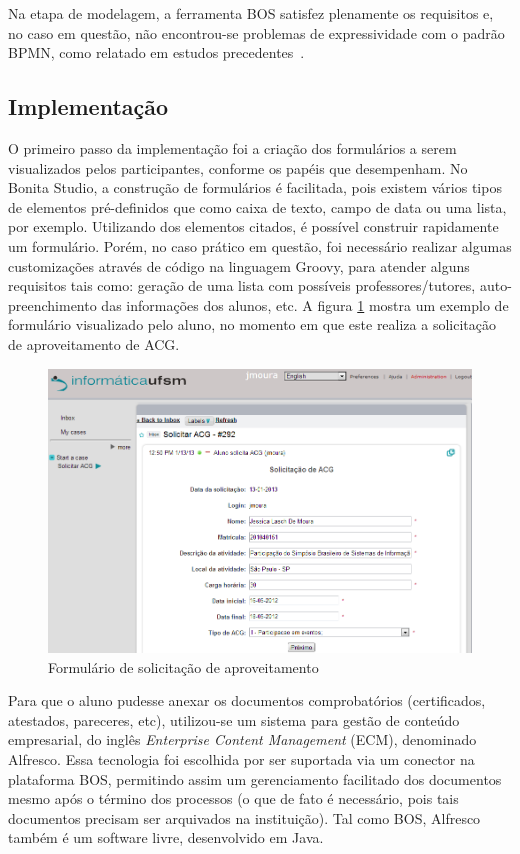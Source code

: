 \documentclass[12pt]{article}
\begin{document}
Na etapa de modelagem, a ferramenta BOS satisfez plenamente os requisitos e, no caso em questão, não encontrou-se problemas de expressividade com o padrão BPMN, como relatado em estudos precedentes~\cite{recker2006, muehlen2008}.

\subsection{Implementação}


O primeiro passo da implementação foi a criação dos formulários a serem visualizados pelos participantes, conforme os papéis que desempenham. No Bonita Studio, a construção de formulários é facilitada, pois existem vários tipos de elementos pré-definidos que como caixa de texto, campo de data ou uma lista, por exemplo. Utilizando dos elementos citados, é possível construir rapidamente um formulário. Porém, no caso prático em questão, foi necessário realizar algumas customizações através de código na linguagem Groovy, para atender alguns requisitos tais como: geração de uma lista com possíveis professores/tutores, auto-preenchimento das informações dos alunos, etc. A figura \ref{fig:form}  mostra um exemplo de formulário visualizado pelo aluno, no momento em que este realiza a solicitação de aproveitamento de ACG.

\begin{figure}[ht]
\centering
\includegraphics[width=.9\textwidth]{images/formSolicitacao.png}
\caption{Formulário de solicitação de aproveitamento}
\label{fig:form}
\end{figure}

Para que o aluno pudesse anexar os documentos comprobatórios (certificados, atestados, pareceres, etc), utilizou-se um sistema para gestão de conteúdo empresarial, do inglês \emph{Enterprise Content Management} (ECM), denominado Alfresco. Essa tecnologia foi escolhida por ser suportada via um conector na plataforma BOS, permitindo assim um gerenciamento facilitado dos documentos mesmo após o término dos processos (o que de fato é necessário, pois tais documentos precisam ser arquivados na instituição). Tal como BOS, Alfresco também é um software livre, desenvolvido em Java.
\end{document}
